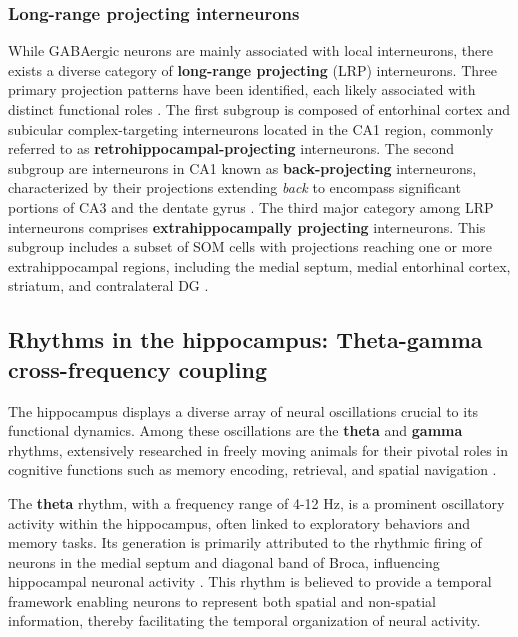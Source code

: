 \documentclass[../main.tex]{subfiles}
\begin{document}
\subsubsection{Long-range projecting interneurons}
While GABAergic neurons are mainly associated with local interneurons, there exists a diverse category of \textbf{long-range projecting} (LRP) interneurons.
Three primary projection patterns have been identified, each likely associated with distinct functional roles \citep{jinno2007neuronal,melzer2020diversity}.
The first subgroup is composed of entorhinal cortex and subicular complex-targeting interneurons located in the CA1 region, commonly referred to as \textbf{retrohippocampal-projecting} interneurons.
The second subgroup are interneurons in CA1 known as \textbf{back-projecting} interneurons, characterized by their projections extending \textit{back} to encompass significant portions of CA3 and the dentate gyrus \citep{sik1994inhibitory}.
The third major category among LRP interneurons comprises \textbf{extrahippocampally projecting} interneurons.
This subgroup includes a subset of SOM cells with projections reaching one or more extrahippocampal regions, including the medial septum, medial entorhinal cortex, striatum, and contralateral DG \citep{melzer2012long}.

\subsection{Rhythms in the hippocampus: Theta-gamma cross-frequency coupling}
The hippocampus displays a diverse array of neural oscillations crucial to its functional dynamics.
Among these oscillations are the \textbf{theta} and \textbf{gamma} rhythms, extensively researched in freely moving animals for their pivotal roles in cognitive functions such as memory encoding, retrieval, and spatial navigation \citep{buzsaki_theta_2002,colgin_rhythms_2016}.

The \textbf{theta} rhythm, with a frequency range of 4-12 Hz, is a prominent oscillatory activity within the hippocampus, often linked to exploratory behaviors and memory tasks.
Its generation is primarily attributed to the rhythmic firing of neurons in the medial septum and diagonal band of Broca, influencing hippocampal neuronal activity \citep{buzsaki_theta_2002,buzsaki2006rhythms,mizuseki_theta_2009}.
This rhythm is believed to provide a temporal framework enabling neurons to represent both spatial and non-spatial information, thereby facilitating the temporal organization of neural activity.
\end{document}
